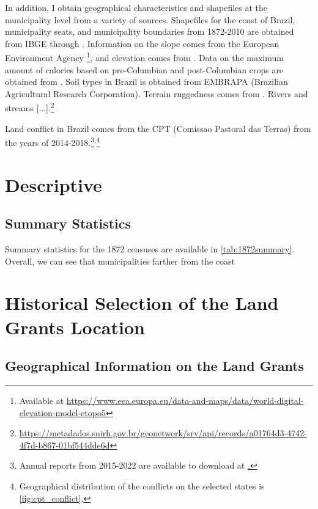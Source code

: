 \documentclass{article}
\begin{document}
In addition, I obtain geographical characteristics and shapefiles at the municipality level from a variety of sources. 
Shapefiles for the coast of Brazil, municipality seats, and municipality boundaries from 1872-2010 are obtained from IBGE through \textcite{Pereira2023-qq}.
Information on the slope comes from the European Environment Agency
\footnote{
  Available at \url{https://www.eea.europa.eu/data-and-maps/data/world-digital-elevation-model-etopo5}}, and elevation comes from \textcite{Amatulli2018-gl}.
Data on the maximum amount of calories based on pre-Columbian and post-Columbian crops are obtained from \textcite{Galor2016-ba}. 
Soil types in Brazil is obtained from EMBRAPA (Brazilian Agricultural Research Corporation).
Terrain ruggedness comes from \textcite{Nunn2012-hb}.
Rivers and streams [...].\footnote{\url{https://metadados.snirh.gov.br/geonetwork/srv/api/records/a01764d3-4742-4f7d-b867-01bf544dde6d}}

Land conflict in Brazil comes from the CPT (Comissao Pastoral das Terras) from the years of 2014-2018.\footnote{Annual reports from 2015-2022 are available to download at \href{https://www.cptnacional.org.br/downlods/category/4-areas-em-conflito}.}\textsuperscript{,}\footnote{Geographical distribution of the conflicts on the selected states is \autoref{fig:cpt_conflict}.}

\parencite{Klein_Goldewijk2017-mr}

\section{Descriptive}

\subsection{Summary Statistics}

Summary statistics for the 1872 censuses are available in \autoref{tab:1872summary}. Overall, we can see that municipalities farther from the coast 

\section{Historical Selection of the Land Grants Location}

\subsection{Geographical Information on the Land Grants}
\end{document}
